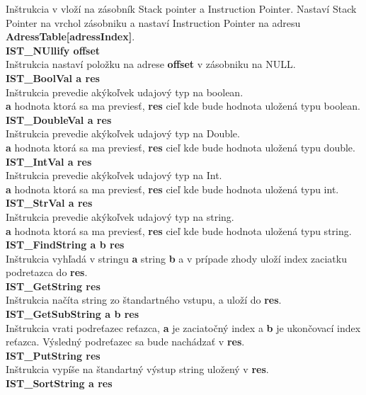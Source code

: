\documentclass[12pt,a4paper,titlepage,final]{article}
\begin{document}
Inštrukcia v vloží na zásobník Stack pointer a Instruction Pointer. Nastaví
Stack Pointer na vrchol zásobniku a nastaví Instruction Pointer na adresu
\textbf{AdressTable[adressIndex]}.\\
\textbf{IST\_NUllify offset}\\
Inštrukcia nastaví položku na adrese \textbf{offset} v zásobniku na NULL.\\
\textbf{IST\_BoolVal a res } \\
Inštrukcia prevedie akýkoľvek udajový typ na boolean.\\
\textbf{a} hodnota ktorá sa ma previesť, \textbf{res} cieľ kde bude hodnota uložená typu
boolean. \\
\textbf{IST\_DoubleVal a res } \\
Inštrukcia prevedie akýkoľvek udajový typ na Double.\\
\textbf{a} hodnota ktorá sa ma previesť, \textbf{res} cieľ kde bude hodnota uložená typu
double. \\
\textbf{IST\_IntVal a res } \\
Inštrukcia prevedie akýkoľvek udajový typ na Int.\\
\textbf{a} hodnota ktorá sa ma previesť, \textbf{res} cieľ kde bude hodnota uložená typu
int. \\
\textbf{IST\_StrVal a res } \\
Inštrukcia prevedie akýkoľvek udajový typ na string.\\
\textbf{a} hodnota ktorá sa ma previesť, \textbf{res} cieľ kde bude hodnota uložená typu
string. \\
\textbf{IST\_FindString a b res} \\
Inštrukcia vyhľadá v stringu \textbf{a} string \textbf{b} a v prípade zhody
uloží index zaciatku podretazca do \textbf{res}.\\
\textbf{IST\_GetString res} \\
Inštrukcia načíta string zo štandartného vstupu, a uloží do \textbf{res}. \\
\textbf{IST\_GetSubString a b res}\\
Inštrukcia vrati podreťazec reťazca, \textbf{a} je zaciatočný index a \textbf{b} je
ukončovací index reťazca. Výsledný podreťazec sa bude nachádzať v \textbf{res}.\\
\textbf{IST\_PutString res}\\
Inštrukcia vypíše na štandartný výstup string uložený v \textbf{res}.\\
\textbf{IST\_SortString a res}\\
\end{document}
